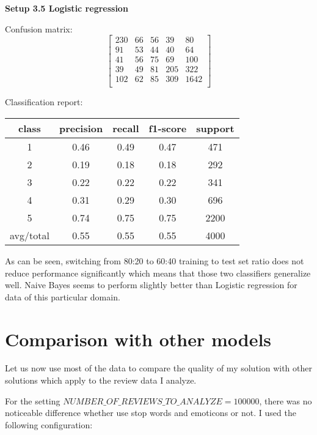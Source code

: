 \documentclass[12pt]{report}
\begin{document}
\textbf{Setup 3.5 Logistic regression}

Confusion matrix:
\[
\begin{bmatrix}
230 & 66 & 56 & 39 & 80 \\
91 & 53 & 44 & 40 & 64 \\
41 & 56 & 75 & 69 & 100 \\
39 & 49 & 81 & 205 & 322 \\
102 & 62 & 85 & 309 & 1642 \\
\end{bmatrix}
\]

Classification report:

\begin{center}
	\begin{tabular}{c | c | c | c | c }
		\hline
		class & precision & recall & f1-score & support \\ \hline
		1 & 0.46 & 0.49 & 0.47 & 471 \\ \hline
		2 & 0.19 & 0.18 & 0.18 & 292 \\ \hline
		3 & 0.22 & 0.22 & 0.22 & 341 \\ \hline
		4 & 0.31 & 0.29 & 0.30 & 696 \\ \hline
		5 & 0.74 & 0.75 & 0.75 & 2200 \\ \hline
		avg/total & 0.55 & 0.55 & 0.55 & 4000 \\ \hline
	\end{tabular}
\end{center}


As can be seen, switching from 80:20 to 60:40 training to test set ratio does not reduce performance significantly which means that those two classifiers generalize well. Naive Bayes seems to perform slightly better than Logistic regression for data of this particular domain.

\newpage

\section{Comparison with other models}

Let us now use most of the data to compare the quality of my solution with other solutions which apply to the review data I analyze.

For the setting $NUMBER\_OF\_REVIEWS\_TO\_ANALYZE = 100000$, there was no noticeable difference whether use stop words and emoticons or not. I used the following configuration:
\end{document}
